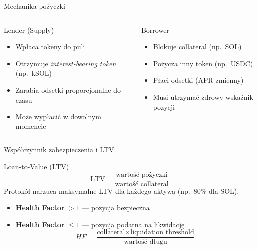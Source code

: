 \begin{frame}{Mechanika pożyczki}
  \begin{columns}
      \begin{block}{Lender (Supply)}
        \begin{itemize}
          \item Wpłaca tokeny do puli
          \item Otrzymuje \emph{interest-bearing token} (np.\ kSOL)
          \item Zarabia odsetki proporcjonalne do czasu
          \item Może wypłacić w dowolnym momencie
        \end{itemize}
      \end{block}

      \begin{block}{Borrower}
        \begin{itemize}
          \item Blokuje collateral (np.\ SOL)
          \item Pożycza inny token (np.\ USDC)
          \item Płaci odsetki (APR zmienny)
          \item Musi utrzymać zdrowy wskaźnik pozycji
        \end{itemize}
      \end{block}
  \end{columns}
\end{frame}

\begin{frame}{Współczynnik zabezpieczenia i LTV}
  \begin{block}{Loan-to-Value (LTV)}
    \[
      \text{LTV} = \frac{\text{wartość pożyczki}}{\text{wartość collateral}}
    \]
    Protokół narzuca maksymalne LTV dla każdego aktywa (np.\ 80\% dla SOL).
  \end{block}
  \vspace{0.3cm}
  \begin{itemize}
    \item \textbf{Health Factor} $> 1$ --- pozycja bezpieczna
    \item \textbf{Health Factor} $\leq 1$ --- pozycja podatna na likwidację
    \[
      HF = \frac{\text{collateral} \times \text{liquidation threshold}}{\text{wartość długu}}
    \]
  \end{itemize}
\end{frame}

